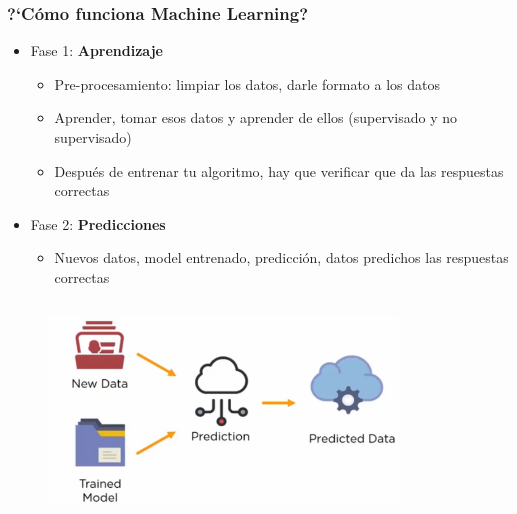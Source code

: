\documentclass[10pt]{beamer}
\begin{document}
\begin{frame}
\frametitle{?`C\'omo funciona Machine Learning?}
\begin{beamerboxesrounded}[upper=uppercolor, lower=lowercolor, shadow=true]{} 

\begin{itemize}
 \item Fase 1: \textbf{Aprendizaje}
   \begin{itemize}
     \item Pre-procesamiento: limpiar los datos, darle formato a los datos
     \item Aprender, tomar esos datos y aprender de ellos (supervisado y no supervisado)
     \item Despu\'es de entrenar tu algoritmo, hay que verificar que da las respuestas correctas
   \end{itemize}    
 
 \item Fase 2: \textbf{Predicciones}
   \begin{itemize}
     \item Nuevos datos, model entrenado, predicci\'on, datos predichos
las respuestas correctas
   \end{itemize}    


\end{itemize}
\end{beamerboxesrounded}

\begin{columns}

\hspace{5mm}
\hspace{5mm}
\begin{column}{\textwidth}
 \begin{figure}
 \includegraphics[scale=0.275]{./Figures/fase2.png} 
 \end{figure}
\end{column}%

\begin{column}{.33\textwidth}
 \begin{figure}
 \end{figure}  
\end{column}%

\end{columns}

\end{frame}
\end{document}
